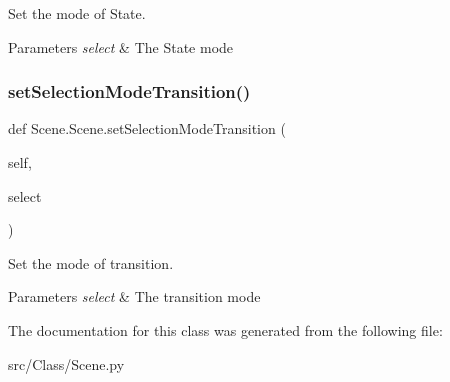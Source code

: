 Set the mode of State. 


\begin{DoxyParams}{Parameters}
{\em select} & The State mode \\
\hline
\end{DoxyParams}
\mbox{\label{classScene_1_1Scene_ada613427a24da5cd438d1a72ed881b8a}} 
\subsubsection{\texorpdfstring{setSelectionModeTransition()}{setSelectionModeTransition()}}
{\footnotesize\ttfamily def Scene.\+Scene.\+set\+Selection\+Mode\+Transition (\begin{DoxyParamCaption}\item[{}]{self,  }\item[{}]{select }\end{DoxyParamCaption})}



Set the mode of transition. 


\begin{DoxyParams}{Parameters}
{\em select} & The transition mode \\
\hline
\end{DoxyParams}


The documentation for this class was generated from the following file\+:\begin{DoxyCompactItemize}
\item 
src/\+Class/Scene.\+py\end{DoxyCompactItemize}
